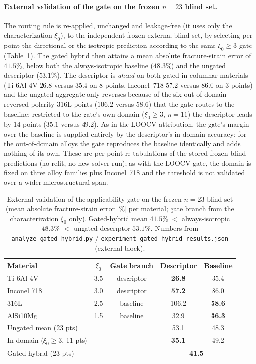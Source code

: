 \documentclass[11pt,a4paper,twocolumn]{article}
\begin{document}
\paragraph{External validation of the gate on the frozen $n=23$ blind set.}
The routing rule is re-applied, unchanged and leakage-free (it uses only the characterization $\xi_0$), to the independent frozen external blind set, by selecting per point the directional or the isotropic prediction according to the same $\xi_0\ge3$ gate (Table~\ref{tab:si_gate_ext}). The gated hybrid then attains a mean absolute fracture-strain error of $41.5\%$, below both the always-isotropic baseline ($48.3\%$) and the ungated descriptor ($53.1\%$). The descriptor is \emph{ahead} on both gated-in columnar materials (Ti-6Al-4V $26.8$ versus $35.4$ on 8 points, Inconel~718 $57.2$ versus $86.0$ on 3 points) and the ungated aggregate only reverses because of the six out-of-domain reversed-polarity 316L points ($106.2$ versus $58.6$) that the gate routes to the baseline; restricted to the gate's own domain ($\xi_0\ge3$, $n=11$) the descriptor leads by $14$ points ($35.1$ versus $49.2$). As in the LOOCV attribution, the gate's margin over the baseline is supplied entirely by the descriptor's in-domain accuracy: for the out-of-domain alloys the gate reproduces the baseline identically and adds nothing of its own. These are per-point re-tabulations of the stored frozen blind predictions (no refit, no new solver run); as with the LOOCV gate, the domain is fixed on three alloy families plus Inconel~718 and the threshold is not validated over a wider microstructural span.

\begin{table}[tp]
\centering
\caption{External validation of the applicability gate on the frozen $n=23$ blind set (mean absolute fracture-strain error [\%] per material; gate branch from the characterization $\xi_0$ only). Gated-hybrid mean $41.5\%$ $<$ always-isotropic $48.3\%$ $<$ ungated descriptor $53.1\%$. Numbers from \texttt{analyze\_gated\_hybrid.py} / \texttt{experiment\_gated\_hybrid\_results.json} (external block).}
\label{tab:si_gate_ext}
\footnotesize
\setlength{\tabcolsep}{4pt}
\begin{tabular}{lcccc}
\toprule
\textbf{Material} & $\xi_0$ & \textbf{Gate branch} & Descriptor & Baseline \\
\midrule
Ti-6Al-4V   & 3.5 & descriptor & \textbf{26.8} & 35.4 \\
Inconel 718 & 3.0 & descriptor & \textbf{57.2} & 86.0 \\
316L        & 2.5 & baseline   & 106.2 & \textbf{58.6} \\
AlSi10Mg    & 1.5 & baseline   & 32.9  & \textbf{36.3} \\
\midrule
Ungated mean (23 pts) & & & 53.1 & 48.3 \\
In-domain ($\xi_0\ge3$, 11 pts) & & & \textbf{35.1} & 49.2 \\
Gated hybrid (23 pts) & & & \multicolumn{2}{c}{\textbf{41.5}} \\
\bottomrule
\end{tabular}
\end{table}
\end{document}

